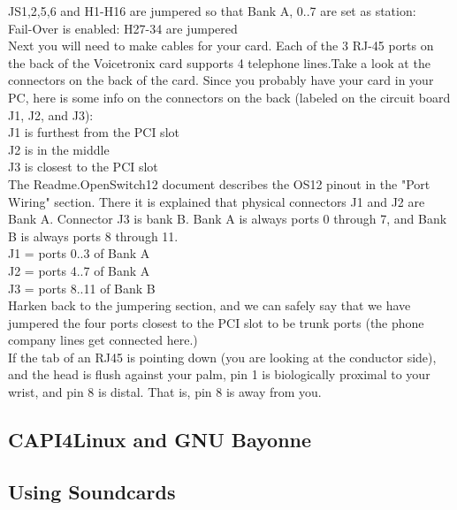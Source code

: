 \documentclass[a4paper,12pt]{article}
\begin{document}
\noindent
JS1,2,5,6 and H1-H16 are jumpered so that Bank A, 0..7 are set as station: \\

\noindent
Fail-Over is enabled: H27-34 are jumpered \\

\indent
Next you will need to make cables for your card.  Each of the 3 RJ-45
ports on the back of the Voicetronix card supports 4 telephone lines.Take
a look at the connectors on the back of the card.  Since you
probably have your card in your PC, here is some info on the
connectors on the back (labeled on the circuit board J1, J2, and J3): \\

\noindent
        J1 is furthest from the PCI slot \\
        J2 is in the middle \\
        J3 is closest to the PCI slot \\

\indent
The Readme.OpenSwitch12 document describes the OS12 pinout in the "Port
Wiring" section.  There it is explained that physical connectors J1
and J2 are Bank A.  Connector J3 is bank B.  Bank A is always ports 0
through 7, and Bank B is always ports 8 through 11. \\

\noindent
        J1 = ports 0..3 of Bank A \\
        J2 = ports 4..7 of Bank A \\
        J3 = ports 8..11 of Bank B \\

\indent
Harken back to the jumpering section, and we can safely say that we have
jumpered the four ports closest to the PCI slot to be trunk ports (the
phone company lines get connected here.) \\

If the tab of an RJ45 is pointing down (you are looking at the
conductor side), and the head is flush against your palm, pin 1 is
biologically proximal to your wrist, and pin 8 is distal.  That is,
pin 8 is away from you. \\

\subsection{CAPI4Linux and GNU Bayonne}

\subsection{Using Soundcards}
\end{document}
